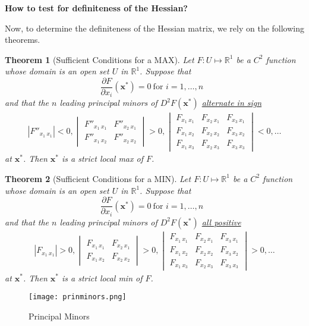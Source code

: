 \documentclass[10pt,a4paper]{book}
\newtheorem{theorem}{Theorem}[section]
\theoremstyle{definition}\newtheorem{definition}{Definition}
\theoremstyle{definition}\newtheorem{fact}{Fact}
\theoremstyle{definition}\newtheorem{ex}{Ex.}
\theoremstyle{definition}\newtheorem{project}{Project}
\theoremstyle{definition}\newtheorem{problem}{Problem}
\theoremstyle{definition}\newtheorem{example}{Example}
\numberwithin{theorem}{chapter}
\numberwithin{corollary}{chapter}
\numberwithin{assumption}{chapter}
\numberwithin{definition}{chapter}
\numberwithin{prop}{chapter}
\numberwithin{notation}{chapter}
\numberwithin{problem}{chapter}
\numberwithin{example}{chapter}
\numberwithin{fact}{chapter}
\numberwithin{ex}{chapter}
\newenvironment{ftheorem}
{\begin{mdframed}\begin{theorem}}
		{\end{theorem}\end{mdframed}}
\def\R{\mathbb R}
\def\R{\mathbb R}
\def\x{\mathbf x}
\begin{document}
	\textbf{How to test for definiteness of the Hessian?}
	
	Now, to determine the definiteness of the Hessian matrix, we rely on the following theorems.
	
	\begin{ftheorem}[Sufficient Conditions for a MAX]
		Let $F: U \mapsto \R^1$ be a $C^2$ function whose domain is an open set $U$ in $\R^1$. Suppose that
		\begin{equation*}
			\frac{\partial F}{\partial x_i} (\x^*) = 0 \ \text{for $i = 1, \dots, n$ }
		\end{equation*}
		and that the $n$ leading principal minors of $D^2 F(\x^*)$ \underline{alternate in sign}
		\begin{align*}
			|F''_{x_1 \ x_1}| < 0, 
			\begin{vmatrix}
				F''_{x_1 \ x_1} & F''_{x_2 \ x_1} \\
				F''_{x_1 \ x_2} & F''_{x_2 \ x_2} 
			\end{vmatrix} > 0,
			\begin{vmatrix}
				F_{x_1 \ x_1} & F_{x_2 \ x_1} & F_{x_3 \ x_1} \\
				F_{x_1 \ x_2} & F_{x_2 \ x_2} & F_{x_3 \ x_2} \\
				F_{x_1 \ x_3} & F_{x_2 \ x_3} & F_{x_3 \ x_3} 
			\end{vmatrix} < 0, \dots
		\end{align*}
		at $\x^*$. Then $\x^*$ is a strict local max of $F$.
	\end{ftheorem}
	
	\begin{ftheorem}[Sufficient Conditions for a MIN]
		Let $F: U \mapsto \R^1$ be a $C^2$ function whose domain is an open set $U$ in $\R^1$. Suppose that
		\begin{equation*}
			\frac{\partial F}{\partial x_i} (\x^*) = 0 \ \text{for $i = 1, \dots, n$ }
		\end{equation*}
		and that the $n$ leading principal minors of $D^2 F(\x^*)$ \underline{all positive}
		\begin{align*}
			|F_{x_1 \ x_1}| > 0, 
			\begin{vmatrix}
				F_{x_1 \ x_1} & F_{x_2 \ x_1} \\
				F_{x_1 \ x_2} & F_{x_2 \ x_2} 
			\end{vmatrix} > 0,
			\begin{vmatrix}
				F_{x_1 \ x_1} & F_{x_2 \ x_1} & F_{x_3 \ x_1} \\
				F_{x_1 \ x_2} & F_{x_2 \ x_2} & F_{x_3 \ x_2} \\
				F_{x_1 \ x_3} & F_{x_2 \ x_3} & F_{x_3 \ x_3} 
			\end{vmatrix} > 0, \dots
		\end{align*}
		at $\x^*$. Then $\x^*$ is a strict local min of $F$.
	\end{ftheorem}
	\begin{figure}[ht]
		\centering
		\texttt{[image: prinminors.png]}
		\caption{Principal Minors}
	\end{figure}
	
\end{document}

